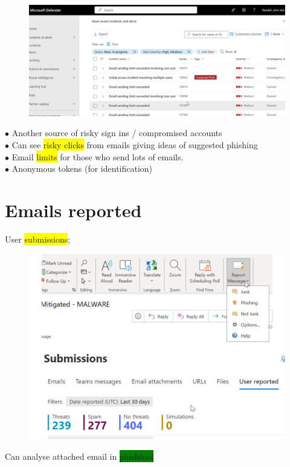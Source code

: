 \documentclass[tikz,border=10pt]{project_plan}
\newcommand{\bulletPoint}{\hspace{-3.1pt}$\bullet$ \hspace{5pt}}
\begin{document}
\begin{figure}[H]
  \centering
  \includegraphics[width=\linewidth]{Microsoft defender.png}
\end{figure}

\bulletPoint Another source of risky sign ins / compromised accounts\\
\bulletPoint Can see \colorbox{yellow}{risky clicks} from emails giving ideas of suggested phishing\\
\bulletPoint Email \colorbox{yellow}{limits} for those who send lots of emails.\\
\bulletPoint Anonymous tokens (for identification)

\newpage

\section{Emails reported}

User \colorbox{yellow}{submissions};

\begin{figure}[H]
  \centering
  \includegraphics[width=.6\linewidth]{user submissions.png}
\end{figure}

Can analyse attached email in \colorbox{green}{phishtool}
\end{document}
